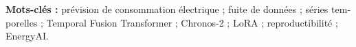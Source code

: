 \begin{otherlanguage}{french}
\textbf{Mots-clés :} prévision de consommation électrique ; fuite de données ; séries temporelles ; Temporal Fusion Transformer ; Chronos-2 ; LoRA ; reproductibilité ; EnergyAI.
\end{otherlanguage}
